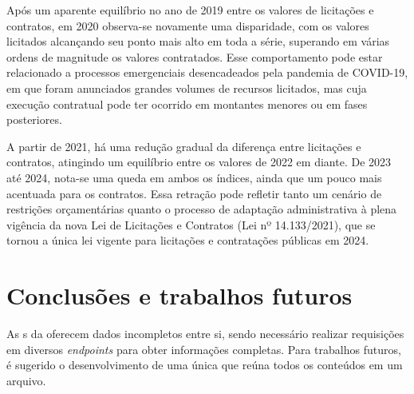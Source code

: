 \documentclass[
	12pt,				%
	oneside,			%
	a4paper,			%
	chapter=TITLE,		%
	section=TITLE,		%
	english,			%
	brazil				%
	]{abntex2}
\begin{document}
Após um aparente equilíbrio no ano de 2019 entre os valores de licitações e contratos, em 2020 observa-se novamente uma disparidade, com os valores licitados alcançando seu ponto mais alto em toda a série, superando em várias ordens de magnitude os valores contratados. Esse comportamento pode estar relacionado a processos emergenciais desencadeados pela pandemia de COVID-19, em que foram anunciados grandes volumes de recursos licitados, mas cuja execução contratual pode ter ocorrido em montantes menores ou em fases posteriores.

A partir de 2021, há uma redução gradual da diferença entre licitações e contratos, atingindo um equilíbrio entre os valores de 2022 em diante. De 2023 até 2024, nota-se uma queda em ambos os índices, ainda que um pouco mais acentuada para os contratos. Essa retração pode refletir tanto um cenário de restrições orçamentárias quanto o processo de adaptação administrativa à plena vigência da nova Lei de Licitações e Contratos (Lei nº 14.133/2021), que se tornou a única lei vigente para licitações e contratações públicas em 2024.

\chapter{Conclusões e trabalhos futuros}
\label{cap:Conclusoes}

As s da  oferecem dados incompletos entre si, sendo necessário realizar requisições em diversos \textit{endpoints} para obter informações completas. Para trabalhos futuros, é sugerido o desenvolvimento de uma única  que reúna todos os conteúdos em um arquivo.

\postextual

\begingroup
    \SingleSpacing\printbibliography[title=REFERÊNCIAS]
\endgroup

%
%
\end{document}
